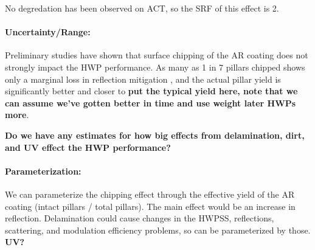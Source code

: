 No degredation has been observed on ACT, so the SRF of this effect is 2.


\paragraph{Uncertainty/Range:}


Preliminary studies have shown that surface chipping of the AR coating does not strongly impact the HWP performance. As many as 1 in 7 pillars chipped shows only a marginal loss in reflection mitigation \cite{SiAR_1}, and the actual pillar yield is significantly better and closer to \textbf{put the typical yield here, note that we can assume we've gotten better in time and use weight later HWPs more}.

\textbf{Do we have any estimates for how big effects from delamination, dirt, and UV effect the HWP performance?}


\paragraph{Parameterization:}
We can parameterize the chipping effect through the effective yield of the AR coating (intact pillars / total pillars). The main effect would be an increase in reflection. Delamination could cause changes in the HWPSS, reflections, scattering, and modulation efficiency problems, so can be parameterized by those. \textbf{UV?}
